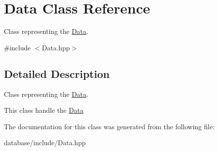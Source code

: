 \hypertarget{class_data}{}\section{Data Class Reference}
\label{class_data}


Class representing the \hyperlink{class_data}{Data}.  




{\ttfamily \#include $<$Data.\+hpp$>$}



\subsection{Detailed Description}
Class representing the \hyperlink{class_data}{Data}. 

This class handle the \hyperlink{class_data}{Data} 

The documentation for this class was generated from the following file\+:\begin{DoxyCompactItemize}
\item 
database/include/Data.\+hpp\end{DoxyCompactItemize}
